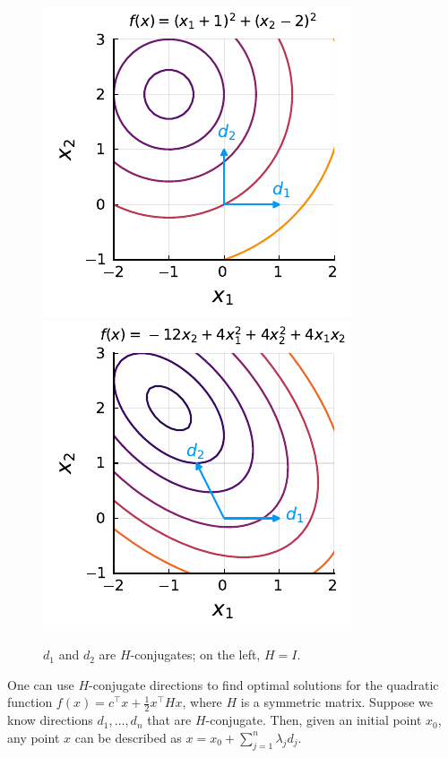 \begin{figure}[H]
	\includegraphics{part_2/chapter_6/figures/orthogonal.pdf}
	\includegraphics{part_2/chapter_6/figures/H-orthogonal.pdf}
	\caption{$d_1$ and $d_2$ are $H$-conjugates; on the left, $H = I$.} \label{fig:conjugates}
\end{figure}


One can use $H$-conjugate directions to find optimal solutions for the quadratic function $f(x) = c^\top x + \frac{1}{2}x^\top Hx$, where $H$ is a symmetric matrix. Suppose we know directions $d_1, \dots, d_n$ that are $H$-conjugate. Then, given an initial point $x_0$, any point $x$ can be described as $x = x_0 + \sum_{j=1}^n \lambda_jd_j$.

